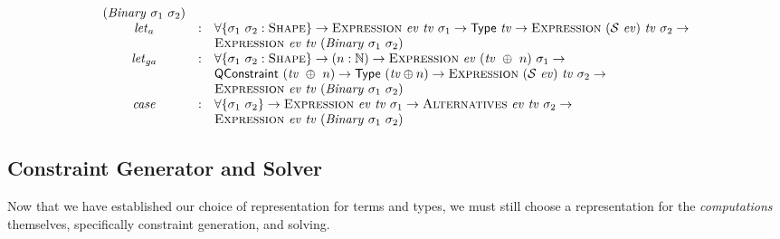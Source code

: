 \documentclass[a4paper]{jfp}
\begin{document}
\begin{figure}
\begin{displaymath}
\begin{array}{l}
\begin{array}{cll}
(\mathit{Binary}\ \sigma_1\ \sigma_2) \\
         \mathit{let}_a & : & \forall \{ \sigma_1\ \sigma_2 : \textsc{Shape} \} \rightarrow \textsc{Expression}\ \mathit{ev}\ \mathit{tv}\ \sigma_1
   \rightarrow \textsf{Type}\ \mathit{tv} \rightarrow \textsc{Expression}\ (\mathcal{S}\ \mathit{ev})\ \mathit{tv}\ \sigma_2 \rightarrow \\ &&\textsc{Expression}\ \mathit{ev}\ \mathit{tv}\
(\mathit{Binary}\ \sigma_1\ \sigma_2) \\
         \mathit{let}_{ga} & : & \forall \{ \sigma_1\ \sigma_2 : \textsc{Shape} \} \rightarrow (n : \mathbb{N}) \rightarrow \textsc{Expression}\
   \mathit{ev}\ (\mathit{tv}\ \oplus\ n)\ \sigma_1 \rightarrow \\ & & \textsf{QConstraint}\ (\mathit{tv}\ \oplus\ n)
   \rightarrow \textsf{Type}\ (\mathit{tv} \oplus n) \rightarrow \textsc{Expression}\ (\mathcal{S}\ \mathit{ev})\ \mathit{tv}\ \sigma_2 \rightarrow \\ &&\textsc{Expression}\ \mathit{ev}\ \mathit{tv}\
(\mathit{Binary}\ \sigma_1\ \sigma_2) \\
         \mathit{case} & : & \forall \{ \sigma_1\ \sigma_2 \} \rightarrow \textsc{Expression}\ \mathit{ev}\ \mathit{tv}\ \sigma_1 \rightarrow
   \textsc{Alternatives}\ \mathit{ev}\ \mathit{tv}\ \sigma_2 \rightarrow \\ & &  \textsc{Expression}\ \mathit{ev}\ \mathit{tv}\ (\mathit{Binary}\ \sigma_1\
\sigma_2) 
         \end{array}
      \end{array}
   \end{displaymath}
   \label{fig:exprrepr}
\end{figure}

\subsection{Constraint Generator and Solver}

Now that we have established our choice of representation for terms and types, we must still choose a representation for the \emph{computations} 
themselves, specifically constraint generation, and solving.
\end{document}
